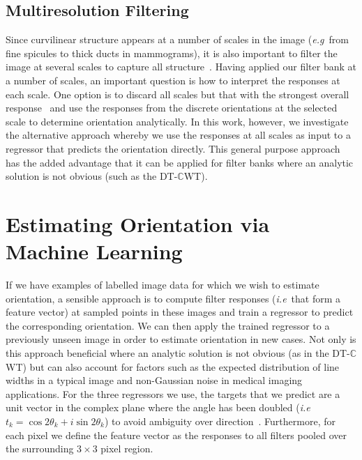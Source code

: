 \documentclass{bmvc2k}
\def\eg{\emph{e.g}\bmvaOneDot}
\def\ie{\emph{i.e}\bmvaOneDot}
\def\dtcwt{DT-$\mathbb{C}$WT}
\newcommand{\comment}[1]{}
\begin{document}
\comment{When dealing with a complex response, $c$, we separate its magnitude, $|c|$, from its phase, $\angle c$. Since orientation is only defined up to a rotation of $180^\circ$, however, a point with phase $\phi$ displaced by $d$ from the centre of a line is indistinguishable from a point with phase $-\phi$ displaced by $-d$ from the same line when looking in the opposite direction; we therefore take the absolute value of phase, $|\angle c|$, at each pixel.}


\subsection{Multiresolution Filtering}
Since curvilinear structure appears at a number of scales in the image (\eg~from fine spicules to thick ducts in mammograms), it is also important to filter the image at several scales to capture all structure~\cite{Lindeberg_IJCV98b}. Having applied our filter bank at a number of scales, an important question is how to interpret the responses at each scale. One option is to discard all scales but that with the strongest overall response~\cite{Karssemeijer_teBrake_TMI96} and use the responses from the discrete orientations at the selected scale to determine orientation analytically. In this work, however, we investigate the alternative approach whereby we use the responses at all scales as input to a regressor that predicts the orientation directly. This general purpose approach has the added advantage that it can be applied for filter banks where an analytic solution is not obvious (such as the \dtcwt).


\section{Estimating Orientation via Machine Learning}
\label{s:learning}
If we have examples of labelled image data for which we wish to estimate orientation, a sensible approach is to compute filter responses (\ie~that form a feature vector) at sampled points in these images and train a regressor to predict the corresponding orientation. We can then apply the trained regressor to a previously unseen image in order to estimate orientation in new cases. Not only is this approach beneficial where an analytic solution is not obvious (as in the \dtcwt) but can also account for factors such as the expected distribution of line widths in a typical image and non-Gaussian noise in medical imaging applications. For the three regressors we use, the targets that we predict are a unit vector in the complex plane where the angle has been doubled (\ie~$t_k = \cos 2\theta_k + i\sin 2\theta_k$) to avoid ambiguity over direction~\cite{Mardia_Jupp_00}. Furthermore, for each pixel we define the feature vector as the responses to all filters pooled over the surrounding $3{\times}3$ pixel region.
\end{document}
